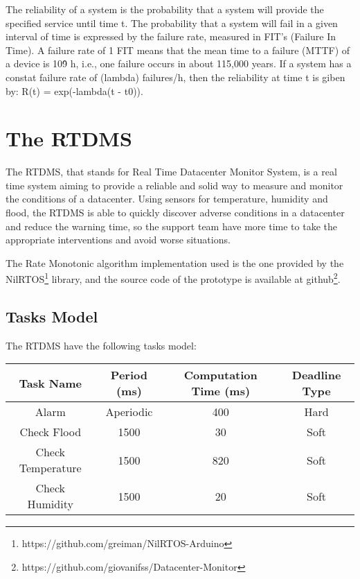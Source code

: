 \documentclass[12pt]{article}
\begin{document}
The reliability of a system is the probability that a system will provide the specified service until time t.
The probability that a system will fail in a given interval of time is expressed by the failure rate, 
measured in FIT's (Failure In Time). A failure rate of 1 FIT means that the mean time to a failure (MTTF) 
of a device is 10\^9 h, i.e., one failure occurs in about 115,000 years.
If a system has a constat failure rate of (lambda) failures/h, then the reliability at time t is giben by:
R(t) = exp(-lambda(t - t0)). \cite{kopetz2011real}

\fi

\section{The RTDMS}

The RTDMS, that stands for Real Time Datacenter Monitor System, is a real time system aiming
to provide a reliable and solid way to measure and monitor the conditions of a datacenter. Using
sensors for temperature, humidity and flood, the RTDMS is able to quickly discover adverse conditions
in a datacenter and reduce the warning time, so the support team have more time to take the
appropriate interventions and avoid worse situations.

The Rate Monotonic algorithm implementation used is the one provided by the NilRTOS\footnote{https://github.com/greiman/NilRTOS-Arduino} 
library, and the source code of the prototype is available at github\footnote{https://github.com/giovanifss/Datacenter-Monitor}.

\subsection{Tasks Model}
The RTDMS have the following tasks model:

\begin{table}[H]
    \begin{tabular}{|c|c|c|c|}
        \hline
        \textbf{Task Name}& \textbf{Period (ms)}& \textbf{Computation Time (ms)}& \textbf{Deadline Type} \\ \hline
        Alarm             & Aperiodic   & 400                   & Hard          \\ \hline
        Check Flood       & 1500        & 30                    & Soft          \\ \hline
        Check Temperature & 1500        & 820                   & Soft          \\ \hline
        Check Humidity    & 1500        & 20                    & Soft          \\
        \hline
    \end{tabular}
\end{table}
\end{document}
